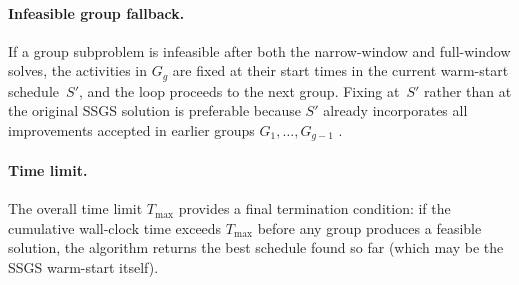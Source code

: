 \paragraph{Infeasible group fallback.}
If a group subproblem is infeasible after both the narrow-window
and full-window solves, the activities in $G_g$ are fixed at
their start times in the current warm-start schedule~$S'$, and
the loop proceeds to the next group. Fixing at~$S'$ rather than
at the original SSGS solution is preferable because $S'$ already
incorporates all improvements accepted in earlier groups
$G_1, \ldots, G_{g-1}$ \parencite{bigler2024multisite}.

\paragraph{Time limit.}
The overall time limit $T_{\max}$ provides a final termination
condition: if the cumulative wall-clock time exceeds $T_{\max}$
before any group produces a feasible solution, the algorithm
returns the best schedule found so far (which may be the SSGS
warm-start itself).

